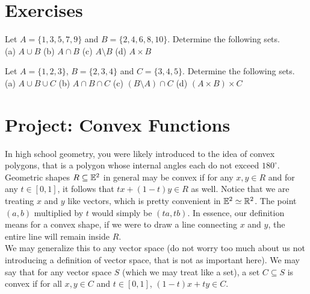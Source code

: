\section*{Exercises}
\setcounter{section}{5}

\begin{exercise}
  Let $A = \{1, 3, 5, 7, 9\}$ and $B = \{2, 4, 6, 8, 10\}$.
  Determine the following sets. \\
  (a) $A \cup B$ \quad
  (b) $A \cap B$ \quad
  (c) $A \setminus B$ \quad
  (d) $A \times B$
\end{exercise}

\begin{exercise}
  Let $A = \{1, 2, 3\}$, $B = \{2, 3, 4\}$ and $C = \{3, 4, 5\}$.
  Determine the following sets. \\
  (a) $A \cup B \cup C$ \quad
  (b) $A \cap B \cap C$ \quad
  (c) $(B \setminus A) \cap C$ \quad
  (d) $(A \times B) \times C$
\end{exercise}

\section*{Project: \textbf{Convex Functions}}
\setcounter{section}{6}

In high school geometry, you were likely introduced to the idea of convex polygons, that is a polygon whose internal angles each do not exceed $180^\circ$. Geometric shapes $R \subseteq \mathbb{E}^2$ in general may be convex if for any $x,y\in R$ and for any $t\in[0,1]$, it follows that $tx+(1-t)y\in R$ as well. Notice that we are treating $x$ and $y$ like vectors, which is pretty convenient in $\mathbb{E}^2\simeq \mathbb{R}^2$. The point $(a,b)$ multiplied by $t$ would simply be $(ta,tb)$. In essence, our definition means for a convex shape, if we were to draw a line connecting $x$ and $y$, the entire line will remain inside $R$. \\

We may generalize this to any vector space (do not worry too much about us not introducing a definition of vector space, that is not as important here). We may say that for any vector space $S$ (which we may treat like a set), a set $C\subseteq S$ is convex if for all $x,y\in C$ and $t\in[0,1]$, $(1-t)x+ty\in C$.

